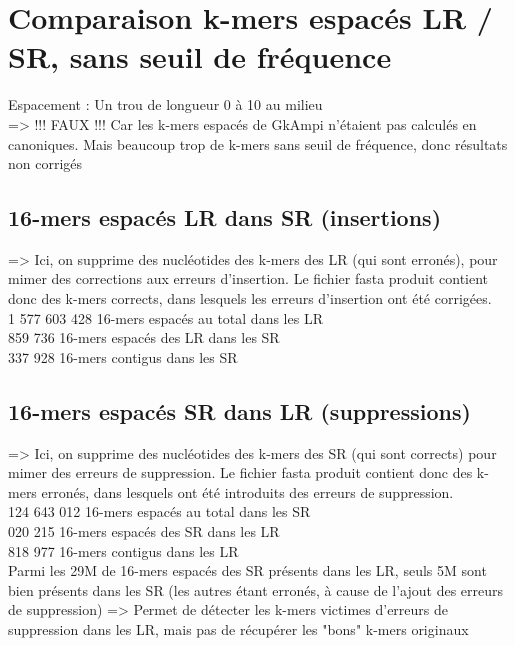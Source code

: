 \documentclass[12pt]{article}
\begin{document}
\section{Comparaison k-mers espacés LR / SR, sans seuil de fréquence}

Espacement : Un trou de longueur 0 à 10 au milieu \\

=> !!! FAUX !!! Car les k-mers espacés de GkAmpi n'étaient pas calculés en canoniques. Mais beaucoup trop de
k-mers sans seuil de fréquence, donc résultats non corrigés

\subsection{16-mers espacés LR dans SR (insertions)}

=> Ici, on supprime des nucléotides des k-mers des LR (qui sont erronés), pour mimer des corrections aux
erreurs d'insertion. Le fichier fasta produit contient donc des k-mers corrects, dans lesquels
les erreurs d'insertion ont été corrigées. \\

1 577 603 428 16-mers espacés au total dans les LR \\
 859 736 16-mers espacés des LR dans les SR \\
 337 928 16-mers contigus dans les SR

\subsection{16-mers espacés SR dans LR (suppressions)}

=> Ici, on supprime des nucléotides des k-mers des SR (qui sont corrects) pour mimer des erreurs de suppression.
Le fichier fasta produit contient donc des k-mers erronés, dans lesquels ont été introduits des erreurs de suppression. \\

124 643 012 16-mers espacés au total dans les SR \\
 020 215 16-mers espacés des SR dans les LR \\
 818 977 16-mers contigus dans les LR \\

Parmi les 29M de 16-mers espacés des SR présents dans les LR, seuls 5M sont bien présents dans les SR (les autres étant erronés, à cause
de l'ajout des erreurs de suppression) => Permet de détecter les k-mers victimes d'erreurs de suppression dans les LR, mais pas de récupérer les "bons"
k-mers originaux
\end{document}
